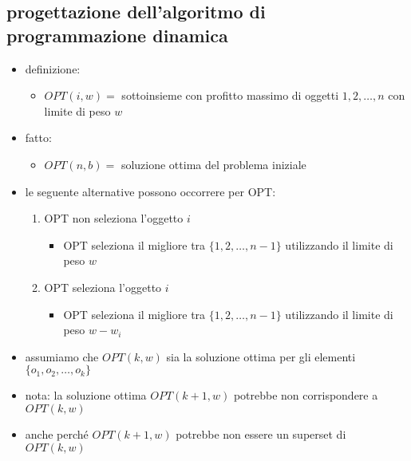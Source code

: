 
\subsection*{progettazione dell'algoritmo di programmazione dinamica}
\begin{flushleft}
	\begin{itemize}
		\item definizione:
		\begin{itemize}
			\item $OPT(i,w)=$ sottoinsieme con profitto massimo di oggetti $1,2,\ldots,n$ con limite di peso $w$
		\end{itemize}
		\item fatto:
		\begin{itemize}
			\item $OPT(n,b)=$ soluzione ottima del problema iniziale
		\end{itemize}
		\item le seguente alternative possono occorrere per OPT:
		\begin{enumerate}
			\item OPT non seleziona l'oggetto $i$
			\begin{itemize}
				\item OPT seleziona il migliore tra $\{1,2,\ldots,n-1\}$ utilizzando il limite di peso $w$
			\end{itemize}
			\item OPT seleziona l'oggetto $i$
			\begin{itemize}
				\item OPT seleziona il migliore tra $\{1,2,\ldots,n-1\}$ utilizzando il limite di peso $w-w_i$
			\end{itemize}
		\end{enumerate}
		\item assumiamo che $OPT(k,w)$ sia la soluzione ottima per gli elementi $\{o_1,o_2,\ldots,o_k\}$
		\item nota: la soluzione ottima $OPT(k+1,w)$ potrebbe non corrispondere a $OPT(k,w)$
		\item anche perch\'e $OPT(k+1,w)$ potrebbe non essere un superset di $OPT(k,w)$
	\end{itemize}
\end{flushleft}


